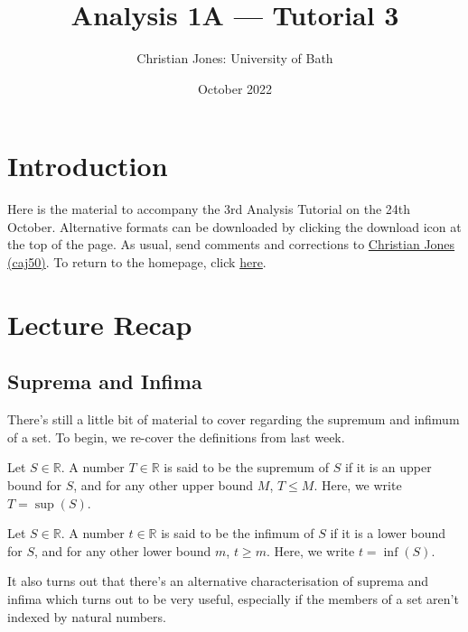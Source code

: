 \documentclass[
  12pt,
  a4paper]{extarticle}
\title{Analysis 1A --- Tutorial 3}
\author{Christian Jones: University of Bath}
\date{October 2022}
\theoremstyle{plain}
\theoremstyle{definition}
\theoremstyle{plain}
\theoremstyle{plain}
\theoremstyle{plain}
\theoremstyle{plain}
\theoremstyle{definition}
\theoremstyle{definition}
\theoremstyle{remark}
\theoremstyle{remark}
\let\BeginKnitrBlock\begin \let\EndKnitrBlock\end
\renewcommand{\;}{\,}
\begin{document}
\maketitle

{
\setcounter{tocdepth}{2}
\tableofcontents
}
\newpage
{}

\hypertarget{introduction}{%
\section*{Introduction}\label{introduction}}

Here is the material to accompany the 3rd Analysis Tutorial on the 24th October. Alternative formats can be downloaded by clicking the download icon at the top of the page. As usual, send comments and corrections to \href{mailto:caj50@bath.ac.uk}{Christian Jones (caj50)}. To return to the homepage, click \href{http://caj50.github.io/tutoring.html}{here}.

\hypertarget{lecture-recap}{%
\section{Lecture Recap}\label{lecture-recap}}

\hypertarget{suprema-and-infima}{%
\subsection{Suprema and Infima}\label{suprema-and-infima}}

There's still a little bit of material to cover regarding the supremum and infimum of a set. To begin, we re-cover the definitions from last week.
\BeginKnitrBlock{definition}[Supremum]
{\label{def:def1} }Let \(S \in \mathbb{R}\). A number \(T \in \mathbb{R}\) is said to be the supremum of \(S\) if it is an upper bound for \(S\), and for any other upper bound \(M\), \(T \leq M\). Here, we write \(T = \sup(S)\).
\EndKnitrBlock{definition}

\BeginKnitrBlock{definition}[Infimum]
{\label{def:def2} }Let \(S \in \mathbb{R}\). A number \(t \in \mathbb{R}\) is said to be the infimum of \(S\) if it is a lower bound for \(S\), and for any other lower bound \(m\), \(t\geq m\). Here, we write \(t = \inf(S)\).
\EndKnitrBlock{definition}
It also turns out that there's an alternative characterisation of suprema and infima which turns out to be very useful, especially if the members of a set aren't indexed by natural numbers.
\end{document}
